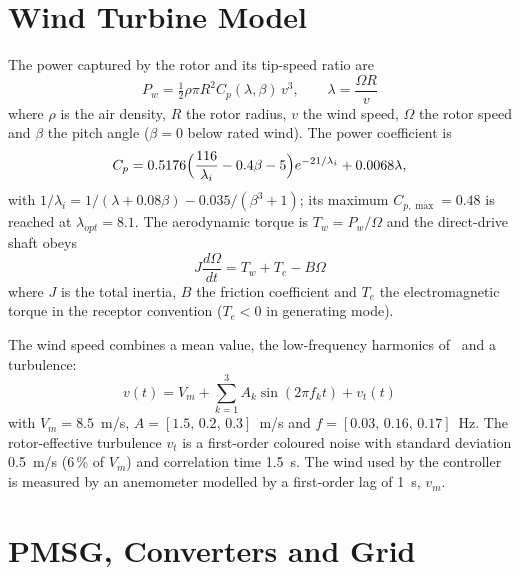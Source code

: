 \documentclass[conference]{IEEEtran}
\begin{document}
\section{Wind Turbine Model}
The power captured by the rotor and its tip-speed ratio are~\cite{heier2014}
\begin{equation}
P_w = \tfrac{1}{2}\rho\pi R^2 C_p(\lambda,\beta)\,v^3,\qquad \lambda=\frac{\Omega R}{v}
\label{eq:pw}
\end{equation}
where $\rho$ is the air density, $R$ the rotor radius, $v$ the wind speed, $\Omega$ the rotor speed and
$\beta$ the pitch angle ($\beta=0$ below rated wind). The power coefficient is
\begin{equation}
C_p = 0.5176\Bigl(\frac{116}{\lambda_i}-0.4\beta-5\Bigr)e^{-21/\lambda_i}+0.0068\lambda,
\label{eq:cp}
\end{equation}
with $1/\lambda_i=1/(\lambda+0.08\beta)-0.035/(\beta^3+1)$; its maximum $C_{p,\max}=0.48$ is reached at
$\lambda_{opt}=8.1$. The aerodynamic torque is $T_w=P_w/\Omega$ and the direct-drive shaft obeys
\begin{equation}
J\frac{d\Omega}{dt} = T_w + T_e - B\Omega
\label{eq:shaft}
\end{equation}
where $J$ is the total inertia, $B$ the friction coefficient and $T_e$ the electromagnetic torque in the
receptor convention ($T_e<0$ in generating mode).

The wind speed combines a mean value, the low-frequency harmonics of~\cite{regani2026} and a turbulence:
\begin{equation}
v(t) = V_m + \textstyle\sum_{k=1}^{3} A_k\sin(2\pi f_k t) + v_t(t)
\label{eq:wind}
\end{equation}
with $V_m=8.5$~m/s, $A=[1.5,\,0.2,\,0.3]$~m/s and $f=[0.03,\,0.16,\,0.17]$~Hz. The rotor-effective
turbulence $v_t$ is a first-order coloured noise with standard deviation 0.5~m/s (6\,\% of $V_m$) and
correlation time 1.5~s. The wind used by the controller is measured by an anemometer modelled by a
first-order lag of 1~s, $v_m$.

\section{PMSG, Converters and Grid}
\end{document}
